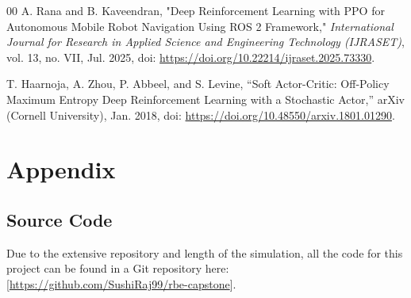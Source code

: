 \documentclass[conference]{IEEEtran}
\begin{document}
\begin{thebibliography}{00}
 A. Rana and B. Kaveendran, "Deep Reinforcement Learning with PPO for Autonomous Mobile Robot Navigation Using ROS 2 Framework," \textit{International Journal for Research in Applied Science and Engineering Technology (IJRASET)}, vol. 13, no. VII, Jul. 2025, doi: \url{https://doi.org/10.22214/ijraset.2025.73330}.

 T. Haarnoja, A. Zhou, P. Abbeel, and S. Levine, “Soft Actor-Critic: Off-Policy Maximum Entropy Deep Reinforcement Learning with a Stochastic Actor,” arXiv (Cornell University), Jan. 2018, doi: \url{https://doi.org/10.48550/arxiv.1801.01290}.

\end{thebibliography}


\newpage
\onecolumn
\appendix
\section{Appendix}
  \subsection{Source Code}
    Due to the extensive repository and length of the simulation, all the code for this project can be found in a Git repository
    here: [\url{https://github.com/SushiRaj99/rbe-capstone}].
    \clearpage
    \newpage
\end{document}
